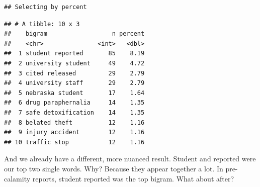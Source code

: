 \documentclass[]{book}
\newenvironment{Shaded}{\begin{snugshade}}{\end{snugshade}}
\newcommand{\DataTypeTok}[1]{\textcolor[rgb]{0.13,0.29,0.53}{#1}}
\newcommand{\DecValTok}[1]{\textcolor[rgb]{0.00,0.00,0.81}{#1}}
\newcommand{\KeywordTok}[1]{\textcolor[rgb]{0.13,0.29,0.53}{\textbf{#1}}}
\newcommand{\NormalTok}[1]{#1}
\newcommand{\OperatorTok}[1]{\textcolor[rgb]{0.81,0.36,0.00}{\textbf{#1}}}
\newcommand{\OtherTok}[1]{\textcolor[rgb]{0.56,0.35,0.01}{#1}}
\newcommand{\StringTok}[1]{\textcolor[rgb]{0.31,0.60,0.02}{#1}}
\begin{document}
\begin{Shaded}
\end{Shaded}

\begin{verbatim}
## Selecting by percent
\end{verbatim}

\begin{verbatim}
## # A tibble: 10 x 3
##    bigram                  n percent
##    <chr>               <int>   <dbl>
##  1 student reported       85    8.19
##  2 university student     49    4.72
##  3 cited released         29    2.79
##  4 university staff       29    2.79
##  5 nebraska student       17    1.64
##  6 drug paraphernalia     14    1.35
##  7 safe detoxification    14    1.35
##  8 belated theft          12    1.16
##  9 injury accident        12    1.16
## 10 traffic stop           12    1.16
\end{verbatim}

And we already have a different, more nuanced result. Student and reported were our top two single words. Why? Because they appear together a lot. In pre-calamity reports, student reported was the top bigram. What about after?
\end{document}
